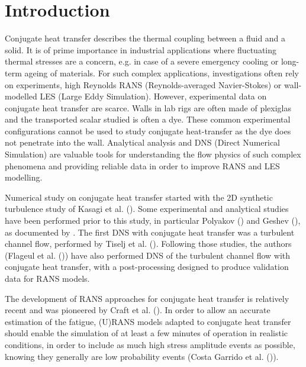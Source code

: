 \documentclass[review]{elsarticle}
\begin{document}
\linenumbers

\section{Introduction}
Conjugate heat transfer describes the thermal coupling between a fluid and a solid.
It is of prime importance in industrial applications where fluctuating thermal stresses are a concern, e.g. in case of a severe emergency cooling or long-term ageing of materials.
For such complex applications, investigations often rely on experiments, high Reynolds RANS (Reynolds-averaged Navier-Stokes) or wall-modelled LES (Large Eddy Simulation).
However, experimental data on conjugate heat transfer are scarce.
Walls in lab rigs are often made of plexiglas and the transported scalar studied is often a dye.
{\color{red} These common experimental configurations cannot be used to study conjugate heat-transfer as the dye does not penetrate into the wall.}
Analytical analysis and DNS (Direct Numerical Simulation) are valuable tools for understanding the flow physics of such complex phenomena and providing reliable data in order to improve RANS and LES modelling.

Numerical study on conjugate heat transfer started with the 2D synthetic turbulence study of Kasagi et al. (\cite{kasagi1989numerical}).
Some experimental and analytical studies have been performed prior to this study, in particular Polyakov (\cite{poliakov1974wall}) and Geshev (\cite{geshev1978influence}), as documented by \cite{kasagi1989numerical}.
The first DNS with conjugate heat transfer was a turbulent channel flow, performed by Tiselj et al. (\cite{Tiselj2001dns}).
Following those studies, the authors (Flageul et al. (\cite{flageul2015dns})) have also performed DNS of the turbulent channel flow with conjugate heat transfer, with a post-processing designed to produce validation data for RANS models.

The development of RANS approaches for conjugate heat transfer is relatively recent and was pioneered by Craft et al. (\cite{craft2010towards}).
In order to allow an accurate estimation of the fatigue, (U)RANS models adapted to conjugate heat transfer should enable the simulation of at least a few minutes of operation in realistic conditions, in order to include as much high stress amplitude events as possible, knowing they generally are low probability events (Costa Garrido et al. (\cite{garrido2016uncertainties})).
\end{document}
